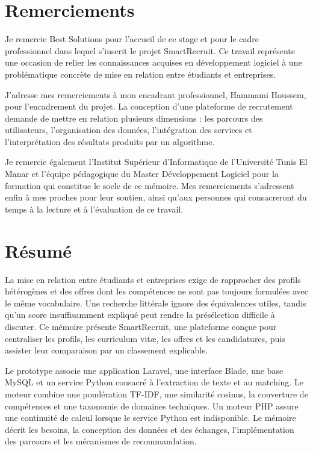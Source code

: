 \chapter*{Remerciements}
Je remercie Best Solutions pour l'accueil de ce stage et pour le cadre professionnel dans lequel s'inscrit le projet SmartRecruit. Ce travail représente une occasion de relier les connaissances acquises en développement logiciel à une problématique concrète de mise en relation entre étudiants et entreprises.

J'adresse mes remerciements à mon encadrant professionnel, Hammami Houssem, pour l'encadrement du projet. La conception d'une plateforme de recrutement demande de mettre en relation plusieurs dimensions : les parcours des utilisateurs, l'organisation des données, l'intégration des services et l'interprétation des résultats produits par un algorithme.

Je remercie également l'Institut Supérieur d'Informatique de l'Université Tunis El Manar et l'équipe pédagogique du Master Développement Logiciel pour la formation qui constitue le socle de ce mémoire. Mes remerciements s'adressent enfin à mes proches pour leur soutien, ainsi qu'aux personnes qui consacreront du temps à la lecture et à l'évaluation de ce travail.

\chapter*{Résumé}
La mise en relation entre étudiants et entreprises exige de rapprocher des profils hétérogènes et des offres dont les compétences ne sont pas toujours formulées avec le même vocabulaire. Une recherche littérale ignore des équivalences utiles, tandis qu'un score insuffisamment expliqué peut rendre la présélection difficile à discuter. Ce mémoire présente SmartRecruit, une plateforme conçue pour centraliser les profils, les curriculum vitæ, les offres et les candidatures, puis assister leur comparaison par un classement explicable.

Le prototype associe une application Laravel, une interface Blade, une base MySQL et un service Python consacré à l'extraction de texte et au matching. Le moteur combine une pondération TF-IDF, une similarité cosinus, la couverture de compétences et une taxonomie de domaines techniques. Un moteur PHP assure une continuité de calcul lorsque le service Python est indisponible. Le mémoire décrit les besoins, la conception des données et des échanges, l'implémentation des parcours et les mécanismes de recommandation.

